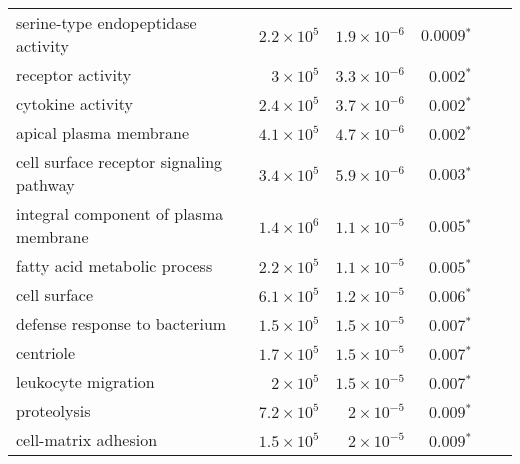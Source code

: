 \begin{longtable}{|l|r|r|r|r|r|}
    serine-type endopeptidase activity                  & $2.2\times 10^{5}$ & $1.9\times 10^{-6}$  & $\bm{0.0009{^*}}$                                        \\
    receptor activity                                   & $ 3\times 10^{5}$  & $3.3\times 10^{-6}$  & $\bm{ 0.002{^*}}$                                        \\
    cytokine activity                                   & $2.4\times 10^{5}$ & $3.7\times 10^{-6}$  & $\bm{ 0.002{^*}}$                                        \\
    apical plasma membrane                              & $4.1\times 10^{5}$ & $4.7\times 10^{-6}$  & $\bm{ 0.002{^*}}$                                        \\
    cell surface receptor signaling pathway             & $3.4\times 10^{5}$ & $5.9\times 10^{-6}$  & $\bm{ 0.003{^*}}$                                        \\
    integral component of plasma membrane               & $1.4\times 10^{6}$ & $1.1\times 10^{-5}$  & $\bm{ 0.005{^*}}$                                        \\
    fatty acid metabolic process                        & $2.2\times 10^{5}$ & $1.1\times 10^{-5}$  & $\bm{ 0.005{^*}}$                                        \\
    cell surface                                        & $6.1\times 10^{5}$ & $1.2\times 10^{-5}$  & $\bm{ 0.006{^*}}$                                        \\
    defense response to bacterium                       & $1.5\times 10^{5}$ & $1.5\times 10^{-5}$  & $\bm{ 0.007{^*}}$                                        \\
    centriole                                           & $1.7\times 10^{5}$ & $1.5\times 10^{-5}$  & $\bm{ 0.007{^*}}$                                        \\
    leukocyte migration                                 & $ 2\times 10^{5}$  & $1.5\times 10^{-5}$  & $\bm{ 0.007{^*}}$                                        \\
    proteolysis                                         & $7.2\times 10^{5}$ & $ 2\times 10^{-5}$   & $\bm{ 0.009{^*}}$                                        \\
    cell-matrix adhesion                                & $1.5\times 10^{5}$ & $ 2\times 10^{-5}$   & $\bm{ 0.009{^*}}$                                        \\

\end{longtable}
